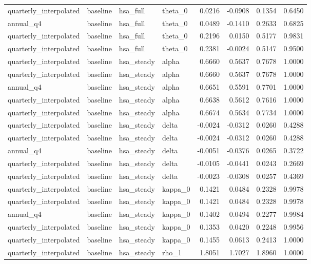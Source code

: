 \begin{tabular}{llllrrrr}
quarterly\_interpolated & baseline & hsa\_full & theta\_0 & 0.0216 & -0.0908 & 0.1354 & 0.6450 \\
annual\_q4 & baseline & hsa\_full & theta\_0 & 0.0489 & -0.1410 & 0.2633 & 0.6825 \\
quarterly\_interpolated & baseline & hsa\_full & theta\_0 & 0.2196 & 0.0150 & 0.5177 & 0.9831 \\
quarterly\_interpolated & baseline & hsa\_full & theta\_0 & 0.2381 & -0.0024 & 0.5147 & 0.9500 \\
quarterly\_interpolated & baseline & hsa\_steady & alpha & 0.6660 & 0.5637 & 0.7678 & 1.0000 \\
quarterly\_interpolated & baseline & hsa\_steady & alpha & 0.6660 & 0.5637 & 0.7678 & 1.0000 \\
annual\_q4 & baseline & hsa\_steady & alpha & 0.6651 & 0.5591 & 0.7701 & 1.0000 \\
quarterly\_interpolated & baseline & hsa\_steady & alpha & 0.6638 & 0.5612 & 0.7616 & 1.0000 \\
quarterly\_interpolated & baseline & hsa\_steady & alpha & 0.6674 & 0.5634 & 0.7734 & 1.0000 \\
quarterly\_interpolated & baseline & hsa\_steady & delta & -0.0024 & -0.0312 & 0.0260 & 0.4288 \\
quarterly\_interpolated & baseline & hsa\_steady & delta & -0.0024 & -0.0312 & 0.0260 & 0.4288 \\
annual\_q4 & baseline & hsa\_steady & delta & -0.0051 & -0.0376 & 0.0265 & 0.3722 \\
quarterly\_interpolated & baseline & hsa\_steady & delta & -0.0105 & -0.0441 & 0.0243 & 0.2669 \\
quarterly\_interpolated & baseline & hsa\_steady & delta & -0.0023 & -0.0308 & 0.0257 & 0.4369 \\
quarterly\_interpolated & baseline & hsa\_steady & kappa\_0 & 0.1421 & 0.0484 & 0.2328 & 0.9978 \\
quarterly\_interpolated & baseline & hsa\_steady & kappa\_0 & 0.1421 & 0.0484 & 0.2328 & 0.9978 \\
annual\_q4 & baseline & hsa\_steady & kappa\_0 & 0.1402 & 0.0494 & 0.2277 & 0.9984 \\
quarterly\_interpolated & baseline & hsa\_steady & kappa\_0 & 0.1353 & 0.0420 & 0.2248 & 0.9956 \\
quarterly\_interpolated & baseline & hsa\_steady & kappa\_0 & 0.1455 & 0.0613 & 0.2413 & 1.0000 \\
quarterly\_interpolated & baseline & hsa\_steady & rho\_1 & 1.8051 & 1.7027 & 1.8960 & 1.0000 \\

\end{tabular}
